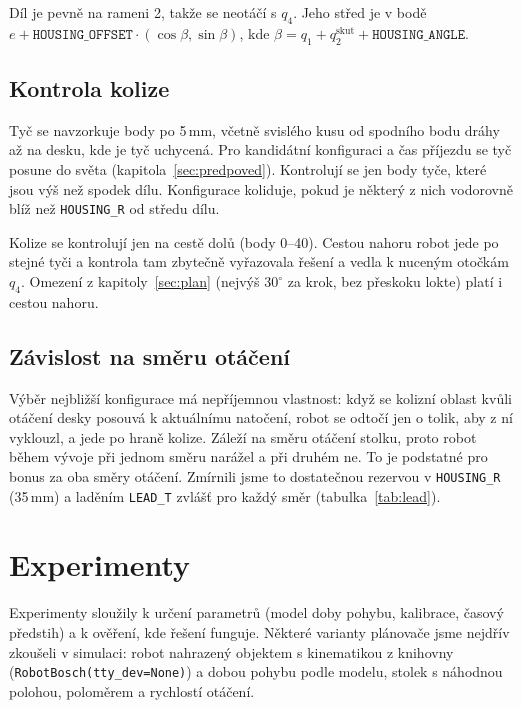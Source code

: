 \documentclass[11pt,a4paper]{article}
\begin{document}
Díl je pevně na rameni 2, takže se neotáčí s $q_4$. Jeho střed je v bodě
$e + \texttt{HOUSING\_OFFSET}\cdot(\cos\beta, \sin\beta)$, kde
$\beta = q_1 + q_2^\mathrm{skut} + \texttt{HOUSING\_ANGLE}$.

\subsection{Kontrola kolize}

Tyč se navzorkuje body po 5\,mm, včetně svislého kusu od spodního bodu dráhy až na desku, kde
je tyč uchycená. Pro kandidátní konfiguraci a čas příjezdu se tyč posune do světa
(kapitola~\ref{sec:predpoved}). Kontrolují se jen body tyče, které jsou výš než spodek dílu.
Konfigurace koliduje, pokud je některý z nich vodorovně blíž než \texttt{HOUSING\_R} od
středu dílu.

Kolize se kontrolují jen na cestě dolů (body 0--40). Cestou nahoru robot jede po stejné tyči
a kontrola tam zbytečně vyřazovala řešení a vedla k nuceným otočkám $q_4$. Omezení
z kapitoly~\ref{sec:plan} (nejvýš $30^\circ$ za krok, bez přeskoku lokte) platí i cestou nahoru.

\subsection{Závislost na směru otáčení}
\label{sec:smer}

Výběr nejbližší konfigurace má nepříjemnou vlastnost: když se kolizní oblast kvůli otáčení
desky posouvá k aktuálnímu natočení, robot se odtočí jen o tolik, aby z ní vyklouzl, a jede
po hraně kolize. Záleží na směru otáčení stolku, proto robot během vývoje při jednom směru
narážel a při druhém ne. To je podstatné pro bonus za oba směry otáčení. Zmírnili jsme to
dostatečnou rezervou v \texttt{HOUSING\_R} (35\,mm) a laděním \texttt{LEAD\_T} zvlášť pro
každý směr (tabulka~\ref{tab:lead}).

\section{Experimenty}

Experimenty sloužily k určení parametrů (model doby pohybu, kalibrace, časový předstih)
a k ověření, kde řešení funguje. Některé varianty plánovače jsme nejdřív zkoušeli v simulaci:
robot nahrazený objektem s kinematikou z knihovny (\texttt{RobotBosch(tty\_dev=None)}) a dobou
pohybu podle modelu, stolek s náhodnou polohou, poloměrem a rychlostí otáčení.
\end{document}
